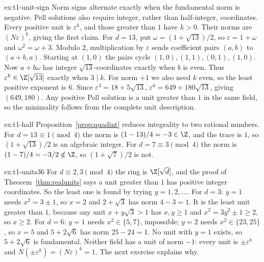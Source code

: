 \begin{solution}{ex:t1-unit-sign}
\idea Norm signs alternate exactly when the fundamental norm is negative.
Pell solutions also require integer, rather than half-integer, coordinates.
\writeup Every positive unit is $\varepsilon^k$, and those greater than
$1$ have $k>0$. Their norms are $(N\varepsilon)^k$, giving the first claim.
For $d=13$, put $\omega=(1+\sqrt{13})/2$, so $\varepsilon=1+\omega$ and
$\omega^2=\omega+3$. Modulo $2$, multiplication by $\varepsilon$
sends coefficient pairs $(a,b)$ to $(a+b,a)$.
Starting at $(1,0)$ the pairs cycle
$(1,0),(1,1),(0,1),(1,0)$.
Now $a+b\omega$ has integer $\sqrt{13}$-coordinates exactly when $b$ is even.
Thus $\varepsilon^k\in\Z[\sqrt{13}]$ exactly when $3\mid k$.
For norm $+1$ we also need $k$ even, so the least positive exponent is $6$.
Since $\varepsilon^3=18+5\sqrt{13}$,
$\varepsilon^6=649+180\sqrt{13}$, giving $(649,180)$.
Any positive Pell solution is a unit greater than $1$ in the same field,
so the minimality follows from the complete unit description.
\end{solution}

\begin{solution}{ex:t1-half}
\idea Proposition~\ref{prop:quadint} reduces integrality to two rational numbers.
\writeup For $d=13\equiv 1\pmod 4$ the norm is $(1-13)/4=-3\in\Z$, and the trace is $1$, so $(1+\sqrt{13})/2$ is an algebraic integer. For $d=7\equiv 3\pmod 4$ the norm is $(1-7)/4=-3/2\notin\Z$, so $(1+\sqrt{7})/2$ is not.
\end{solution}

\begin{solution}{ex:t1-units36}
\idea For $d\equiv2,3\pmod4$ the ring is $\Z[\sqrt d]$, and the proof of Theorem~\ref{thm:realunits} says a unit greater than $1$ has positive integer coordinates. So the least one is found by trying $y=1,2,\dots$.
\writeup For $d=3$: $y=1$ needs $x^2=3\pm1$, so $x=2$ and $2+\sqrt3$ has norm $4-3=1$. It is the least unit greater than $1$, because any unit $x+y\sqrt3>1$ has $x,y\ge1$ and $x^2=3y^2\pm1\ge2$, so $x\ge2$. For $d=6$: $y=1$ needs $x^2\in\{5,7\}$, impossible; $y=2$ needs $x^2\in\{23,25\}$, so $x=5$ and $5+2\sqrt6$ has norm $25-24=1$. No unit with $y=1$ exists, so $5+2\sqrt6$ is fundamental. Neither field has a unit of norm $-1$: every unit is $\pm\varepsilon^k$ and $N(\pm\varepsilon^k)=(N\varepsilon)^k=1$. The next exercise explains why.
\end{solution}

